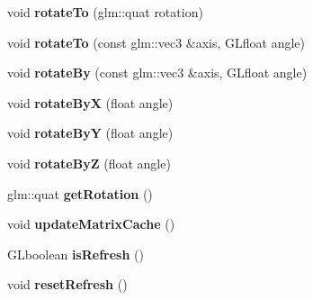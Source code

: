 \begin{DoxyCompactItemize}
\item 
\hypertarget{classfillwave_1_1models_1_1Moveable_a960be3d4bba7c8f731d14752065620e6}{}void {\bfseries rotate\+To} (glm\+::quat rotation)\label{classfillwave_1_1models_1_1Moveable_a960be3d4bba7c8f731d14752065620e6}

\item 
\hypertarget{classfillwave_1_1models_1_1Moveable_a6b3695bdc6d68495127923b2a762bc03}{}void {\bfseries rotate\+To} (const glm\+::vec3 \&axis, G\+Lfloat angle)\label{classfillwave_1_1models_1_1Moveable_a6b3695bdc6d68495127923b2a762bc03}

\item 
\hypertarget{classfillwave_1_1models_1_1Moveable_ab9f7b74bec0f4eb4ad0cbf93e4d8a466}{}void {\bfseries rotate\+By} (const glm\+::vec3 \&axis, G\+Lfloat angle)\label{classfillwave_1_1models_1_1Moveable_ab9f7b74bec0f4eb4ad0cbf93e4d8a466}

\item 
\hypertarget{classfillwave_1_1models_1_1Moveable_afb2f915e789e5f7af7caa775fa309345}{}void {\bfseries rotate\+By\+X} (float angle)\label{classfillwave_1_1models_1_1Moveable_afb2f915e789e5f7af7caa775fa309345}

\item 
\hypertarget{classfillwave_1_1models_1_1Moveable_a868bdb9664eed8559f3789da9b552edc}{}void {\bfseries rotate\+By\+Y} (float angle)\label{classfillwave_1_1models_1_1Moveable_a868bdb9664eed8559f3789da9b552edc}

\item 
\hypertarget{classfillwave_1_1models_1_1Moveable_a034425f7edea53aa972888d4e7caddf3}{}void {\bfseries rotate\+By\+Z} (float angle)\label{classfillwave_1_1models_1_1Moveable_a034425f7edea53aa972888d4e7caddf3}

\item 
\hypertarget{classfillwave_1_1models_1_1Moveable_ac98450f7e4dcee2ebfa5843959f7959b}{}glm\+::quat {\bfseries get\+Rotation} ()\label{classfillwave_1_1models_1_1Moveable_ac98450f7e4dcee2ebfa5843959f7959b}

\item 
\hypertarget{classfillwave_1_1models_1_1Moveable_a1f92109aa22af23c98fed1ce2241a9ce}{}void {\bfseries update\+Matrix\+Cache} ()\label{classfillwave_1_1models_1_1Moveable_a1f92109aa22af23c98fed1ce2241a9ce}

\item 
\hypertarget{classfillwave_1_1models_1_1Moveable_a2f208d69a1e64a178ed7644932030e49}{}G\+Lboolean {\bfseries is\+Refresh} ()\label{classfillwave_1_1models_1_1Moveable_a2f208d69a1e64a178ed7644932030e49}

\item 
\hypertarget{classfillwave_1_1models_1_1Moveable_ad0c2c37583f7f9af3bad4fe00dc968f6}{}void {\bfseries reset\+Refresh} ()\label{classfillwave_1_1models_1_1Moveable_ad0c2c37583f7f9af3bad4fe00dc968f6}

\end{DoxyCompactItemize}

